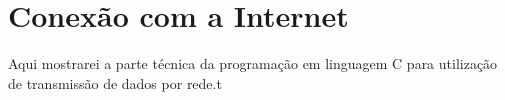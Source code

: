 
\section{Conexão com a Internet}

Aqui mostrarei a parte técnica da programação em linguagem C para utilização de
transmissão de dados por rede.t